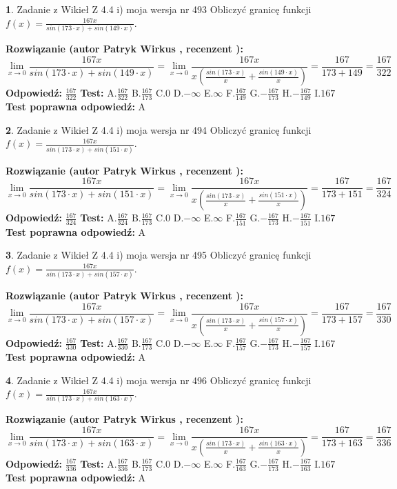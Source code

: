 \documentclass[12pt, a4paper]{article}
\theoremstyle{definition} %
\newtheorem{zad}{}
\newcommand{\zadStart}[1]{\begin{zad}#1\newline}
\newcommand{\zadStop}{\end{zad}}
\newcommand{\rozwStart}[2]{\noindent \textbf{Rozwiązanie (autor #1 , recenzent #2): }\newline}
\newcommand{\rozwStop}{\newline}
\newcommand{\odpStart}{\noindent \textbf{Odpowiedź:}\newline}
\newcommand{\odpStop}{\newline}
\newcommand{\testStart}{\noindent \textbf{Test:}\newline}
\newcommand{\testStop}{\newline}
\newcommand{\kluczStart}{\noindent \textbf{Test poprawna odpowiedź:}\newline}
\newcommand{\kluczStop}{\newline}
\begin{document}
\zadStart{Zadanie z Wikieł Z 4.4 i) moja wersja nr 493}
Obliczyć granicę funkcji $f(x)=\frac{167x}{sin(173\cdot x) +sin(149\cdot x)}$.
\zadStop
\rozwStart{Patryk Wirkus}{}
$$\lim\limits_{x\to 0}\frac{167x}{sin(173\cdot x) +sin(149\cdot x)}=\lim\limits_{x\to 0}\frac{167x}{x(\frac{sin(173\cdot x)}{x}+\frac{sin(149\cdot x)}{x})}=\frac{167}{173+149} = \frac{167}{322}$$
\rozwStop
\odpStart
$\frac{167}{322}$
\odpStop
\testStart
A.$\frac{167}{322}$
B.$\frac{167}{173}$
C.$0$
D.$-\infty$
E.$\infty$
F.$\frac{167}{149}$
G.$-\frac{167}{173}$
H.$-\frac{167}{149}$
I.$167$
\testStop
\kluczStart
A
\kluczStop



\zadStart{Zadanie z Wikieł Z 4.4 i) moja wersja nr 494}
Obliczyć granicę funkcji $f(x)=\frac{167x}{sin(173\cdot x) +sin(151\cdot x)}$.
\zadStop
\rozwStart{Patryk Wirkus}{}
$$\lim\limits_{x\to 0}\frac{167x}{sin(173\cdot x) +sin(151\cdot x)}=\lim\limits_{x\to 0}\frac{167x}{x(\frac{sin(173\cdot x)}{x}+\frac{sin(151\cdot x)}{x})}=\frac{167}{173+151} = \frac{167}{324}$$
\rozwStop
\odpStart
$\frac{167}{324}$
\odpStop
\testStart
A.$\frac{167}{324}$
B.$\frac{167}{173}$
C.$0$
D.$-\infty$
E.$\infty$
F.$\frac{167}{151}$
G.$-\frac{167}{173}$
H.$-\frac{167}{151}$
I.$167$
\testStop
\kluczStart
A
\kluczStop



\zadStart{Zadanie z Wikieł Z 4.4 i) moja wersja nr 495}
Obliczyć granicę funkcji $f(x)=\frac{167x}{sin(173\cdot x) +sin(157\cdot x)}$.
\zadStop
\rozwStart{Patryk Wirkus}{}
$$\lim\limits_{x\to 0}\frac{167x}{sin(173\cdot x) +sin(157\cdot x)}=\lim\limits_{x\to 0}\frac{167x}{x(\frac{sin(173\cdot x)}{x}+\frac{sin(157\cdot x)}{x})}=\frac{167}{173+157} = \frac{167}{330}$$
\rozwStop
\odpStart
$\frac{167}{330}$
\odpStop
\testStart
A.$\frac{167}{330}$
B.$\frac{167}{173}$
C.$0$
D.$-\infty$
E.$\infty$
F.$\frac{167}{157}$
G.$-\frac{167}{173}$
H.$-\frac{167}{157}$
I.$167$
\testStop
\kluczStart
A
\kluczStop



\zadStart{Zadanie z Wikieł Z 4.4 i) moja wersja nr 496}
Obliczyć granicę funkcji $f(x)=\frac{167x}{sin(173\cdot x) +sin(163\cdot x)}$.
\zadStop
\rozwStart{Patryk Wirkus}{}
$$\lim\limits_{x\to 0}\frac{167x}{sin(173\cdot x) +sin(163\cdot x)}=\lim\limits_{x\to 0}\frac{167x}{x(\frac{sin(173\cdot x)}{x}+\frac{sin(163\cdot x)}{x})}=\frac{167}{173+163} = \frac{167}{336}$$
\rozwStop
\odpStart
$\frac{167}{336}$
\odpStop
\testStart
A.$\frac{167}{336}$
B.$\frac{167}{173}$
C.$0$
D.$-\infty$
E.$\infty$
F.$\frac{167}{163}$
G.$-\frac{167}{173}$
H.$-\frac{167}{163}$
I.$167$
\testStop
\kluczStart
A
\kluczStop
\end{document}
